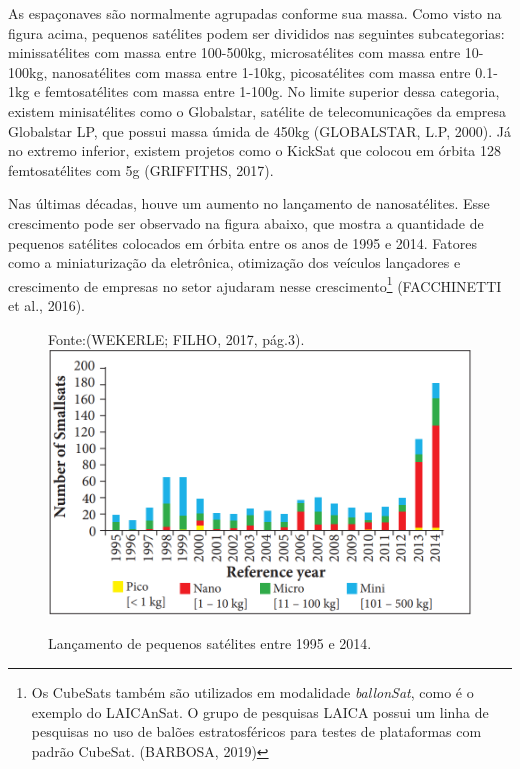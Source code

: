 As espaçonaves são normalmente agrupadas conforme sua massa. Como visto na figura acima, pequenos satélites podem ser divididos nas seguintes subcategorias: minissatélites com massa entre 100-500kg, microsatélites com massa entre 10-100kg, nanosatélites com massa entre 1-10kg, picosatélites com massa entre 0.1-1kg e femtosatélites com massa entre 1-100g. No limite superior dessa categoria, existem minisatélites como o Globalstar, satélite de telecomunicações da empresa Globalstar LP, que possui massa úmida de 450kg (GLOBALSTAR, L.P, 2000). Já no extremo inferior, existem projetos como o KickSat que colocou em órbita 128 femtosatélites  com 5g (GRIFFITHS, 2017).

Nas últimas décadas, houve um aumento no lançamento de nanosatélites. Esse crescimento pode ser observado na figura abaixo, que mostra a quantidade de pequenos satélites colocados em órbita entre os anos de 1995 e 2014. Fatores como a miniaturização da eletrônica, otimização dos veículos lançadores e crescimento de empresas no setor ajudaram nesse crescimento\footnote{Os CubeSats também são utilizados em modalidade \textit{ballonSat}, como é o exemplo do LAICAnSat. O grupo de pesquisas LAICA possui um linha de pesquisas no uso de balões estratosféricos para testes de plataformas com padrão CubeSat. (BARBOSA, 2019)} (FACCHINETTI et al., 2016).


	\begin{figure}[h]
		\centering
		\footnotesize{Fonte:(WEKERLE; FILHO, 2017, pág.3).}
		\includegraphics[keepaspectratio=true,scale=0.55]{figuras/lancamentoPequenoSatellite.PNG}
		\footnotesize{\caption{Lançamento de pequenos satélites entre 1995 e 2014.}}
		\label{fig03A}
	\end{figure}


